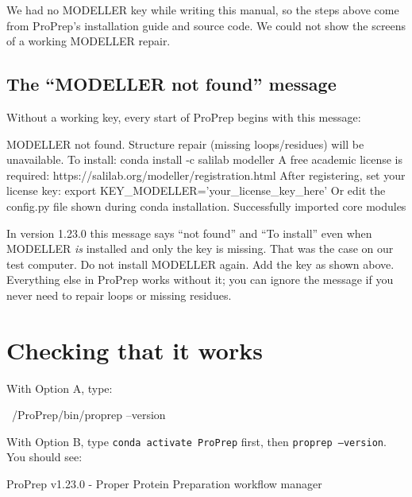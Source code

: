 \begin{behindscenes}
We had no MODELLER key while writing this manual, so the steps above come from
ProPrep's installation guide and source code. We could not show the screens of
a working MODELLER repair.
\end{behindscenes}

\subsection{The ``MODELLER not found'' message}
\label{sec:installation-modeller-msg}

Without a working key, every start of ProPrep begins with this message:

\begin{screen}
MODELLER not found. Structure repair (missing loops/residues) will be unavailable.
  To install: conda install -c salilab modeller
  A free academic license is required: https://salilab.org/modeller/registration.html
  After registering, set your license key:
    export KEY_MODELLER='your_license_key_here'
  Or edit the config.py file shown during conda installation.
Successfully imported core modules
\end{screen}

\begin{watchout}
In version 1.23.0 this message says ``not found'' and ``To install'' even
when MODELLER \emph{is} installed and only the key is missing. That was the
case on our test computer. Do not install MODELLER again. Add the key as shown
above. Everything else in ProPrep works without it; you can ignore the message
if you never need to repair loops or missing residues.
\end{watchout}

\section{Checking that it works}
\label{sec:installation-check}

With Option A, type:

\begin{terminal}
~/ProPrep/bin/proprep --version
\end{terminal}

With Option B, type \texttt{conda activate ProPrep} first, then
\texttt{proprep --version}. You should see:

\begin{screen}
ProPrep v1.23.0 - Proper Protein Preparation workflow manager
\end{screen}


